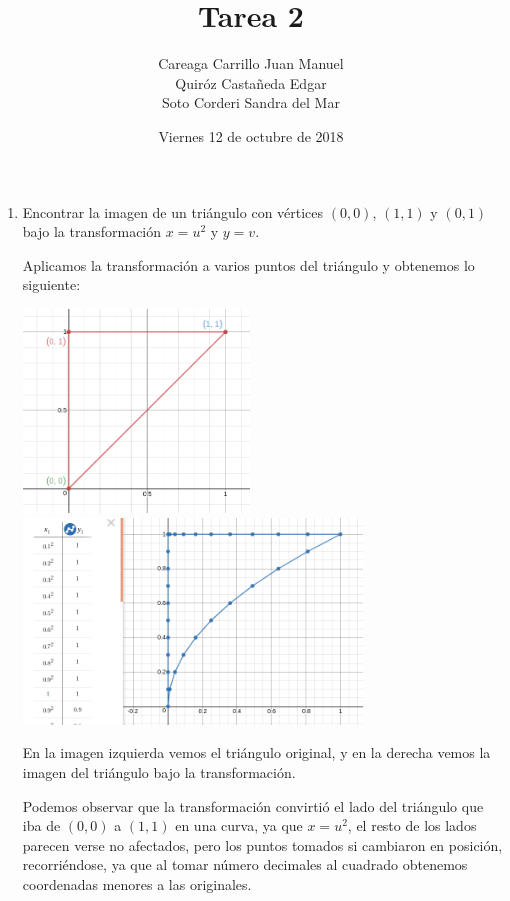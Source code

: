 \documentclass{article}
\begin{document}
    \title{Tarea 2}
    \author{Careaga Carrillo Juan Manuel\\
            Quiróz Castañeda Edgar\\
            Soto Corderi Sandra del Mar}
    \date{Viernes 12 de octubre de 2018}
    \maketitle
    \begin{enumerate}

        \item {
            Encontrar la imagen de un triángulo con vértices $(0,0)$, $(1,1)$
            y $(0,1)$ bajo la transformación $x=u^2$ y $y=v$.

            \color{azul}
          Aplicamos la transformación a varios puntos del triángulo y obtenemos
          lo siguiente:
            \begin{center}
                \includegraphics[width=6cm]{img/ejercicio1-1.png}
                \hspace{.5cm}
                \includegraphics[width=9cm]{img/ejercicio1-2.png}
        	\end{center}
            En la imagen izquierda vemos el triángulo original, y en la derecha
            vemos la imagen del triángulo bajo la transformación.
            
            Podemos observar que la transformación convirtió el lado del
            triángulo que iba de $(0,0)$ a $(1,1)$ en una curva, ya que $x=u^2$,
            el resto de los lados parecen verse no afectados, pero los puntos
            tomados si cambiaron en posición, recorriéndose, ya que al tomar
            número decimales al cuadrado obtenemos coordenadas menores a las
            originales.
	    }


\end{enumerate}
\end{document}
